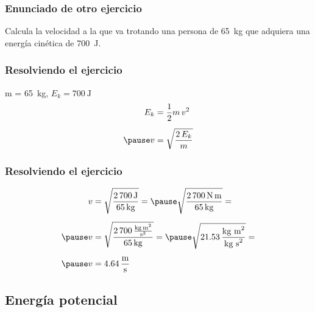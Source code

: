 \documentclass[14pt]{beamer}
\begin{document}
\begin{frame}
\frametitle{Enunciado de otro ejercicio}
Calcula la velocidad a la que va trotando una persona de \SI{65}{\kilo\gram} que adquiera una energía cinética de \SI{700}{\joule}.
\end{frame}
\begin{frame}
\frametitle{Resolviendo el ejercicio}
 \pause m = \SI{65}{\kilo\gram}, \pause $E_{k} = \SI{700}{\joule}$
\\
\bigskip
\pause
{}
\begin{eqnarray*}
\begin{aligned}
E_{k} &= \dfrac{1}{2} m \, v^{2} \\[0.5em] \pause
v &= \sqrt{\dfrac{2 \, E_{k}}{m}}
\end{aligned}
\end{eqnarray*}
\end{frame}
\begin{frame}
\frametitle{Resolviendo el ejercicio}
\pause
\begin{eqnarray*}
\begin{aligned}
v &= \sqrt{\dfrac{2 \, \SI{700}{\joule}}{\SI{65}{\kilo\gram}}} = \pause \sqrt{\dfrac{2 \, \SI{700}{\newton\meter}}{\SI{65}{\kilo\gram}}} = \\[0.5em]\pause 
v &= \sqrt{\dfrac{2 \, \SI[per-mode=fraction]{700}{\kilo\gram\square\meter\per\square\second}}{\SI{65}{\kilo\gram}}} = \pause \sqrt{\num{21.53} \, \dfrac{\text{kg m}^{2}}{\text{kg s}^{2}}} = \\[0.5em] \pause
v &= \SI[per-mode=fraction]{4.64}{\meter\per\second}
\end{aligned}
\end{eqnarray*}
\end{frame}    

\subsection{Energía potencial}
\end{document}
